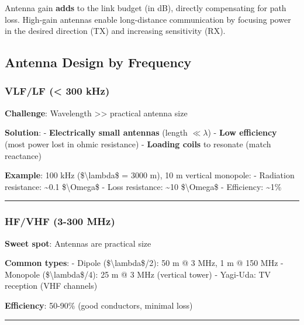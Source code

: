 \begin{keyconcept}
Antenna gain \textbf{adds} to the link budget (in dB), directly compensating for path loss. High-gain antennas enable long-distance communication by focusing power in the desired direction (TX) and increasing sensitivity (RX).
\end{keyconcept}

\subsection{Antenna Design by
Frequency}\label{antenna-design-by-frequency}

\subsubsection{VLF/LF (\textless{} 300 kHz)}\label{vlflf-300-khz}

\textbf{Challenge}: Wavelength \textgreater\textgreater{} practical
antenna size

\textbf{Solution}: - \textbf{Electrically small antennas} (length
\(\ll \lambda\)) - \textbf{Low efficiency} (most power lost in ohmic
resistance) - \textbf{Loading coils} to resonate (match reactance)

\textbf{Example}: 100 kHz (\$\textbackslash lambda\$ = 3000 m), 10 m
vertical monopole: - Radiation resistance: \textasciitilde0.1
\$\textbackslash Omega\$ - Loss resistance: \textasciitilde10
\$\textbackslash Omega\$ - Efficiency: \textasciitilde1\%

\begin{center}\rule{0.5\linewidth}{0.5pt}\end{center}

\subsubsection{HF/VHF (3-300 MHz)}\label{hfvhf-3-300-mhz}

\textbf{Sweet spot}: Antennas are practical size

\textbf{Common types}: - Dipole (\$\textbackslash lambda\$/2): 50 m @ 3
MHz, 1 m @ 150 MHz - Monopole (\$\textbackslash lambda\$/4): 25 m @ 3
MHz (vertical tower) - Yagi-Uda: TV reception (VHF channels)

\textbf{Efficiency}: 50-90\% (good conductors, minimal loss)

\begin{center}\rule{0.5\linewidth}{0.5pt}\end{center}

